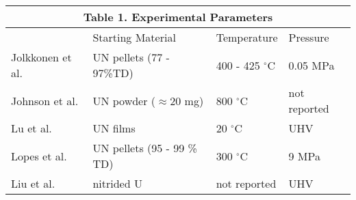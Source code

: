 \documentclass[11pt]{article}
\begin{document}
\setlength{\extrarowheight}{1.5mm}
\begin{tabular}{ p{3.5cm} p{5cm} p{2.5cm} p{2.5cm}  }

	\multicolumn{4}{c}{\textbf{Table 1.} Experimental Parameters} \\
	\hline
	 & Starting Material &Temperature & Pressure\\
	\hline
	Jolkkonen et al. \cite{Jolkkonen2017}   &  UN pellets (77 - 97\%TD) &400 - 425 $^{\circ}$C&  0.05 MPa \\
	Johnson et al. \cite{Johnson2016}   & UN powder ($\approx$20 mg)     &800 $^{\circ}$C&  not reported \\
	Lu et al. \cite{Lu2016}  & UN films    &20 $^{\circ}$C&   UHV \\
	Lopes et al. \cite{Lopes2017}   & UN pellets (95 - 99 \% TD)    & 300 $^{\circ}$C&   9 MPa \\
	Liu et al. & nitrided U & not reported  & UHV\\
	\hline
\end{tabular}
\end{document}
